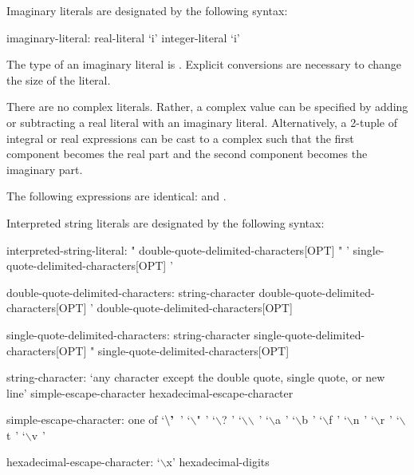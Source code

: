 Imaginary literals are designated by the following syntax:

\begin{syntax}
imaginary-literal:
  real-literal `i'
  integer-literal `i'
\end{syntax}

The type of an imaginary literal is .  Explicit conversions
are necessary to change the size of the literal.

There are no complex literals.  Rather, a complex value can be
specified by adding or subtracting a real literal with an imaginary
literal.  Alternatively, a 2-tuple of integral or real expressions can
be cast to a complex such that the first component becomes the real
part and the second component becomes the imaginary part.
\begin{example}
The following expressions are identical: 
and .
\end{example}

\pagebreak
Interpreted string literals are designated by the following syntax:
\begin{syntax}
interpreted-string-literal:
  " double-quote-delimited-characters[OPT] "
  ' single-quote-delimited-characters[OPT] '

double-quote-delimited-characters:
  string-character double-quote-delimited-characters[OPT]
  ' double-quote-delimited-characters[OPT]

single-quote-delimited-characters:
  string-character single-quote-delimited-characters[OPT]
  " single-quote-delimited-characters[OPT]

string-character:
  `any character except the double quote, single quote, or new line'
  simple-escape-character
  hexadecimal-escape-character

simple-escape-character: one of
  `$\backslash\mbox{\bf '}\hspace{5pt}$' `$\backslash$"$\hspace{5pt}$' `$\backslash$?$\hspace{5pt}$' `$\backslash$$\backslash$$\hspace{5pt}$' `$\backslash$a$\hspace{5pt}$' `$\backslash$b$\hspace{5pt}$' `$\backslash$f$\hspace{5pt}$' `$\backslash$n$\hspace{5pt}$' `$\backslash$r$\hspace{5pt}$' `$\backslash$t$\hspace{5pt}$' `$\backslash$v$\hspace{5pt}$'

hexadecimal-escape-character:
  `$\backslash$x' hexadecimal-digits
\end{syntax}

